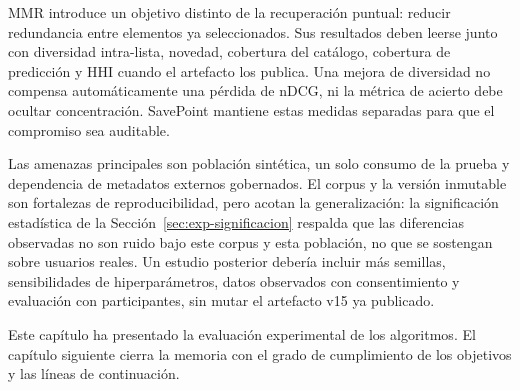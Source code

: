 MMR introduce un objetivo distinto de la recuperación puntual: reducir redundancia entre elementos ya seleccionados. Sus resultados deben leerse junto con diversidad intra-lista, novedad, cobertura del catálogo, cobertura de predicción y HHI cuando el artefacto los publica. Una mejora de diversidad no compensa automáticamente una pérdida de nDCG, ni la métrica de acierto debe ocultar concentración. SavePoint mantiene estas medidas separadas para que el compromiso sea auditable.

Las amenazas principales son población sintética, un solo consumo de la prueba y dependencia de
metadatos externos gobernados. El corpus y la versión inmutable son fortalezas de reproducibilidad,
pero acotan la generalización: la significación estadística de la Sección~\ref{sec:exp-significacion}
respalda que las diferencias observadas no son ruido bajo este corpus y esta población, no
que se sostengan sobre usuarios reales. Un estudio posterior debería incluir más semillas,
sensibilidades de hiperparámetros, datos observados con consentimiento y evaluación con
participantes, sin mutar el artefacto v15 ya publicado.

Este capítulo ha presentado la evaluación experimental de los algoritmos. El capítulo siguiente
cierra la memoria con el grado de cumplimiento de los objetivos y las líneas de continuación.
